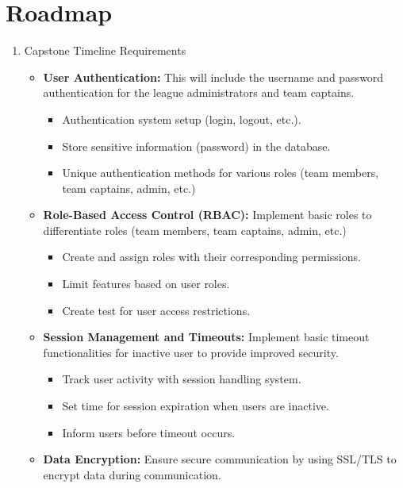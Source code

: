 \documentclass{article}
\begin{document}
\section{Roadmap}

\begin{enumerate}
    \item Capstone Timeline Requirements
          \begin{itemize}
              \item \textbf{User Authentication:} This will include the username and password authentication for the league administrators and team captains.
                    \begin{itemize}
                        \item Authentication system setup (login, logout, etc.).
                        \item Store sensitive information (password) in  the database.
                        \item Unique authentication methods for various roles (team members, team captains, admin, etc.)
                    \end{itemize}
              \item \textbf{Role-Based Access Control (RBAC):} Implement basic roles to differentiate roles (team members, team captains, admin, etc.)
                    \begin{itemize}
                        \item Create and assign roles with their corresponding permissions.
                        \item Limit features based on user roles.
                        \item Create test for user access restrictions.
                    \end{itemize}
              \item \textbf{Session Management and Timeouts:} Implement basic timeout functionalities for inactive user to provide improved security.
                    \begin{itemize}
                        \item Track user activity with session handling system.
                        \item Set time for session expiration when users are inactive.
                        \item Inform users before timeout occurs.
                    \end{itemize}
              \item \textbf{Data Encryption:} Ensure secure communication by using SSL/TLS to encrypt data during communication.

\end{itemize}
\end{enumerate}
\end{document}
